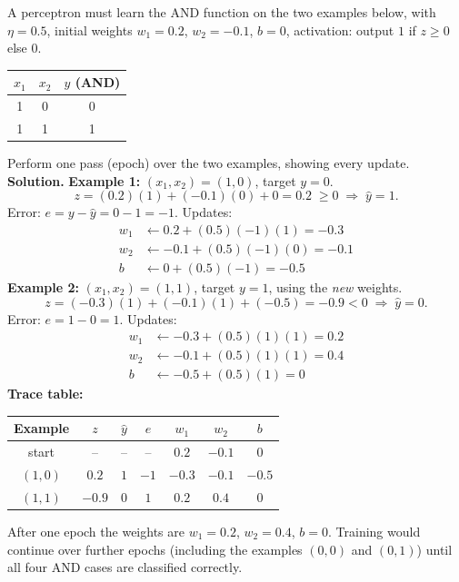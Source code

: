 \documentclass[11pt]{article}
\begin{document}
\begin{exoresolu}
A perceptron must learn the AND function on the two examples below, with $\eta = 0.5$, initial weights $w_1 = 0.2$, $w_2 = -0.1$, $b = 0$, activation: output $1$ if $z \ge 0$ else $0$.
\begin{center}
\begin{tabular}{|c|c|c|}
\hline
\rowcolor{popblueL} $x_1$ & $x_2$ & $y$ (AND) \\
\hline
1 & 0 & 0 \\
\hline
1 & 1 & 1 \\
\hline
\end{tabular}
\end{center}
Perform one pass (epoch) over the two examples, showing every update.
\tcblower
\textbf{Solution.}
\textbf{Example 1:} $(x_1, x_2) = (1, 0)$, target $y = 0$.
\[ z = (0.2)(1) + (-0.1)(0) + 0 = 0.2 \;\ge 0 \;\Rightarrow\; \hat{y} = 1. \]
Error: $e = y - \hat{y} = 0 - 1 = -1$. Updates:
\begin{align*}
w_1 &\leftarrow 0.2 + (0.5)(-1)(1) = -0.3\\
w_2 &\leftarrow -0.1 + (0.5)(-1)(0) = -0.1\\
b &\leftarrow 0 + (0.5)(-1) = -0.5
\end{align*}
\textbf{Example 2:} $(x_1, x_2) = (1, 1)$, target $y = 1$, using the \emph{new} weights.
\[ z = (-0.3)(1) + (-0.1)(1) + (-0.5) = -0.9 < 0 \;\Rightarrow\; \hat{y} = 0. \]
Error: $e = 1 - 0 = 1$. Updates:
\begin{align*}
w_1 &\leftarrow -0.3 + (0.5)(1)(1) = 0.2\\
w_2 &\leftarrow -0.1 + (0.5)(1)(1) = 0.4\\
b &\leftarrow -0.5 + (0.5)(1) = 0
\end{align*}
\textbf{Trace table:}
\begin{center}
\begin{tabular}{|c|c|c|c|c|c|c|}
\hline
\rowcolor{popblueL} Example & $z$ & $\hat{y}$ & $e$ & $w_1$ & $w_2$ & $b$ \\
\hline
start & -- & -- & -- & $0.2$ & $-0.1$ & $0$ \\
\hline
$(1,0)$ & $0.2$ & $1$ & $-1$ & $-0.3$ & $-0.1$ & $-0.5$ \\
\hline
$(1,1)$ & $-0.9$ & $0$ & $1$ & $0.2$ & $0.4$ & $0$ \\
\hline
\end{tabular}
\end{center}
After one epoch the weights are $w_1 = 0.2$, $w_2 = 0.4$, $b = 0$. Training would continue over further epochs (including the examples $(0,0)$ and $(0,1)$) until all four AND cases are classified correctly.
\end{exoresolu}
\end{document}
